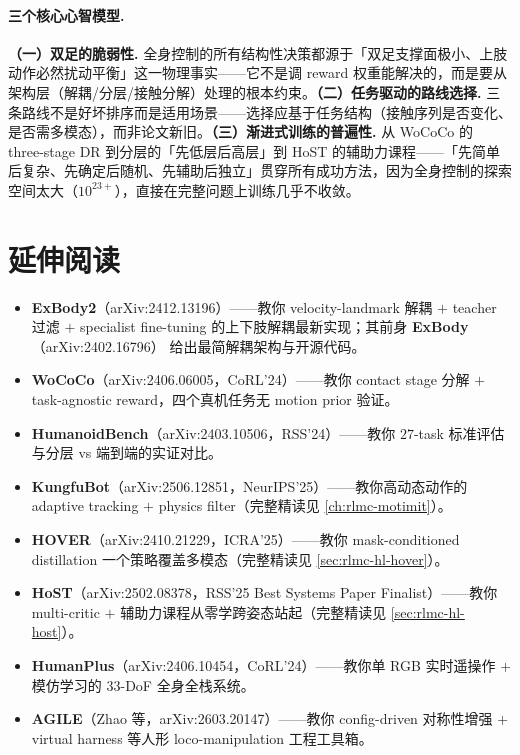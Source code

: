 \paragraph{三个核心心智模型.}
\textbf{（一）双足的脆弱性.} 全身控制的所有结构性决策都源于「双足支撑面极小、上肢动作必然扰动平衡」这一物理事实——它不是调 reward 权重能解决的，而是要从架构层（解耦/分层/接触分解）处理的根本约束。\textbf{（二）任务驱动的路线选择.} 三条路线不是好坏排序而是适用场景——选择应基于任务结构（接触序列是否变化、是否需多模态），而非论文新旧。\textbf{（三）渐进式训练的普遍性.} 从 WoCoCo 的 three-stage DR 到分层的「先低层后高层」到 HoST 的辅助力课程——「先简单后复杂、先确定后随机、先辅助后独立」贯穿所有成功方法，因为全身控制的探索空间太大（$10^{23+}$），直接在完整问题上训练几乎不收敛。

\section*{延伸阅读}

\begin{itemize}
  \item \textbf{ExBody2}（arXiv:2412.13196）\cite{ji2024exbody2}——教你 velocity-landmark 解耦 $+$ teacher 过滤 $+$ specialist fine-tuning 的上下肢解耦最新实现；其前身 \textbf{ExBody}（arXiv:2402.16796）\cite{cheng2024exbody} 给出最简解耦架构与开源代码。
  \item \textbf{WoCoCo}（arXiv:2406.06005，CoRL'24）\cite{zhang2024wococo}——教你 contact stage 分解 $+$ task-agnostic reward，四个真机任务无 motion prior 验证。
  \item \textbf{HumanoidBench}（arXiv:2403.10506，RSS'24）\cite{sferrazza2024humanoidbench}——教你 $27$-task 标准评估与分层 vs 端到端的实证对比。
  \item \textbf{KungfuBot}（arXiv:2506.12851，NeurIPS'25）\cite{xie2025kungfubot}——教你高动态动作的 adaptive tracking $+$ physics filter（完整精读见 \cref{ch:rlmc-motimit}）。
  \item \textbf{HOVER}（arXiv:2410.21229，ICRA'25）\cite{he2025hover}——教你 mask-conditioned distillation 一个策略覆盖多模态（完整精读见 \cref{sec:rlmc-hl-hover}）。
  \item \textbf{HoST}（arXiv:2502.08378，RSS'25 Best Systems Paper Finalist）\cite{huang2025host}——教你 multi-critic $+$ 辅助力课程从零学跨姿态站起（完整精读见 \cref{sec:rlmc-hl-host}）。
  \item \textbf{HumanPlus}（arXiv:2406.10454，CoRL'24）\cite{fu2024humanplus}——教你单 RGB 实时遥操作 $+$ 模仿学习的 $33$-DoF 全身全栈系统。
  \item \textbf{AGILE}（Zhao 等，arXiv:2603.20147）\cite{zhao2026agile}——教你 config-driven 对称性增强 $+$ virtual harness 等人形 loco-manipulation 工程工具箱。
\end{itemize}

